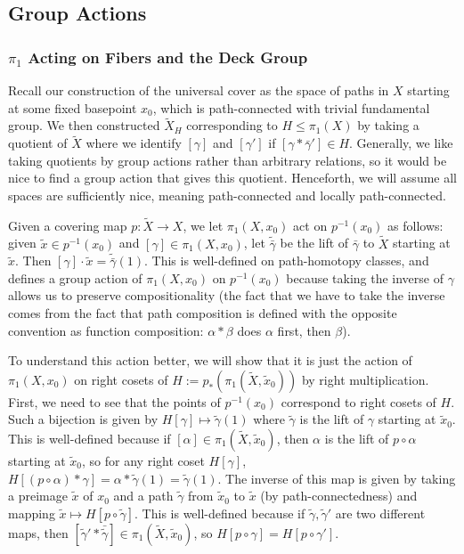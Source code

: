 \documentclass{article}
\theoremstyle{definition}
\theoremstyle{remark}
\numberwithin{figure}{section}
\begin{document}
\subsection{Group Actions}
\subsubsection{$\pi_1$ Acting on Fibers and the Deck Group}
Recall our construction of the universal cover as the space of paths in $X$ starting at some fixed basepoint $x_0$, which is path-connected with trivial fundamental group. We then constructed $\tilde X_H$ corresponding to $H \leq \pi_1(X)$ by taking a quotient of $\tilde X$ where we identify $[\gamma]$ and $[\gamma']$ if $[\gamma * \bar\gamma'] \in H$. Generally, we like taking quotients by group actions rather than arbitrary relations, so it would be nice to find a group action that gives this quotient. Henceforth, we will assume all spaces are sufficiently nice, meaning path-connected and locally path-connected.

Given a covering map $p : \tilde X \to X$, we let $\pi_1(X, x_0)$ act on $p^{-1}(x_0)$ as follows: given $\tilde x \in p^{-1}(x_0)$ and $[\gamma] \in \pi_1(X, x_0)$, let $\tilde{\bar\gamma}$ be the lift of $\bar\gamma$ to $\tilde X$ starting at $\tilde x$. Then $[\gamma] \cdot \tilde x = \tilde{\bar\gamma}(1)$. This is well-defined on path-homotopy classes, and defines a group action of $\pi_1(X, x_0)$ on $p^{-1}(x_0)$ because taking the inverse of $\gamma$ allows us to preserve compositionality (the fact that we have to take the inverse comes from the fact that path composition is defined with the opposite convention as function composition: $\alpha * \beta$ does $\alpha$ first, then $\beta$).

To understand this action better, we will show that it is just the action of $\pi_1(X, x_0)$ on right cosets of $H := p_*(\pi_1(\tilde X, \tilde x_0))$ by right multiplication. First, we need to see that the points of $p^{-1}(x_0)$ correspond to right cosets of $H$. Such a bijection is given by $H[\gamma] \mapsto \tilde\gamma(1)$ where $\tilde\gamma$ is the lift of $\gamma$ starting at $\tilde x_0$. This is well-defined because if $[\alpha] \in \pi_1(\tilde X, \tilde x_0)$, then $\alpha$ is the lift of $p \circ \alpha$ starting at $\tilde x_0$, so for any right coset $H[\gamma]$, $H[(p \circ \alpha) * \gamma] = \alpha * \tilde\gamma(1) = \tilde\gamma(1)$. The inverse of this map is given by taking a preimage $\tilde x$ of $x_0$ and a path $\tilde \gamma$ from $\tilde x_0$ to $\tilde x$ (by path-connectedness) and mapping $\tilde x \mapsto H[p \circ \tilde\gamma]$. This is well-defined because if $\tilde\gamma, \tilde\gamma'$ are two different maps, then $[\tilde\gamma' * \bar{\tilde\gamma}] \in \pi_1(\tilde X, \tilde x_0)$, so $H[p \circ \gamma] = H[p \circ \gamma']$.
\end{document}
